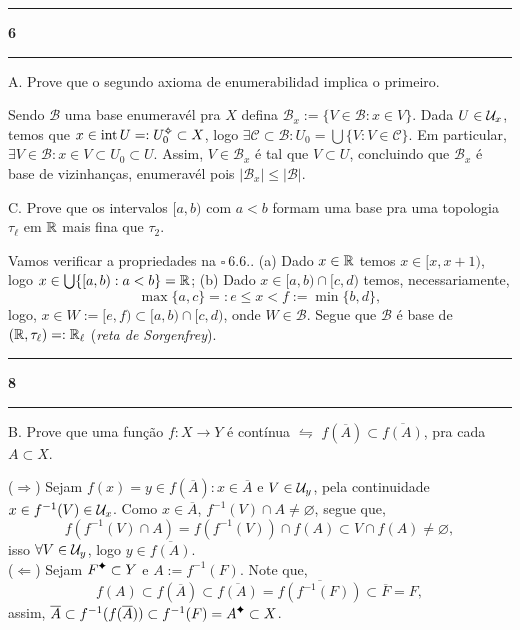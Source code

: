   {\hrule \vspace{-0.15cm}
  \centering \textbf{6} \vspace{0.1cm}
  \hrule}

A. Prove que o segundo axioma de enumerabilidad implica o primeiro.  

\textcolor{gris}{Sendo \(\mathcal{B}\) uma base enumeravél pra \(X\) defina \(\mathcal{B}_x := \{V \in \mathcal{B} : x \in V\}\). Dada \(U \in \mathcal{U}_x\), temos que \(x \in \operatorname{int}U=: U_0\ab\subset X\), logo \(\exists \mathcal{C} \subset \mathcal{B} : U_0 = \bigcup \{V : V \in \mathcal{C}\}\). Em particular, \(\exists V \in \mathcal{B} : x \in V \subset U_0 \subset U\). Assim,  \(V \in \mathcal{B}_x\) é tal que \(V \subset U\), concluindo que \(\mathcal{B}_x\) é base de vizinhanças, enumeravél pois \(|\mathcal{B}_x| \leq |\mathcal{B}|\).   } 

C. Prove que os intervalos \([a,b) \) com \(a<b\) formam uma base pra uma topologia \(\tau_\ell \) em \(\mathbb{R}\) mais fina que \(\tau_2\). 

\textcolor{gris}{Vamos verificar a propriedades na \(\square \ 6.6.\). (a) Dado \(x \in \mathbb{R}\) temos \(x \in [x, x+1)\), logo \(x \in \bigcup \{[a,b) : a <b\}  = \mathbb{R}\); (b) Dado \(x \in [a,b) \cap [c,d)\) temos, necessariamente, 
\[  \max\{a,c \} =: e \leq x < f := \min \{b,d\}, \]
logo, \(x\in W := [e,f) \subset [a,b) \cap [c,d)\), onde \(W \in \mathcal{B}\). Segue que \(\mathcal{B}\) é base de \((\mathbb{R}, \tau_\ell) =: \mathbb{R}_\ell\) (\emph{reta de Sorgenfrey}). \\
}

  {\hrule \vspace{-0.15cm}
  \centering \textbf{8} \vspace{0.1cm}
  \hrule}

B. Prove que uma função \(f : X \to Y \) é contínua \(\leftrightharpoons\) \(f(\overline{A}) \subset \overline{f(A)}\), pra cada \(A \subset X\).  

\textcolor{gris}{(\(\Rightarrow\)) Sejam \( f(x) = y \in f(\overline{A}): x \in \overline{A}\) e \(V\in \mathcal{U}_y\), pela continuidade \(x \in f^{-1}(V) \in \mathcal{U}_x\). Como \(x \in \overline{A}\), \(f^{-1}(V) \cap A \neq \varnothing\), segue que, 
\[f(f^{-1}(V) \cap A) = f(f^{-1}(V)) \cap f(A) \subset V \cap f(A) \neq \varnothing, \]
isso \(\forall V \in \mathcal{U}_y\), logo \(y \in \overline{f(A)}\). \\ 
(\(\Leftarrow\))  Sejam \(F\ce\subset Y\) e \(A := f^{-1}(F)\). Note que, 
\[f(A)\subset f(\overline{A}) \subset \overline{f(A)} = \overline{f(f^{-1}(F))} \subset \overline{F}= F, \]
assim, \(\overline{A} \subset f^{-1}(f(\overline{A})) \subset f^{-1}(F) = A\ce \subset X\). 
}

